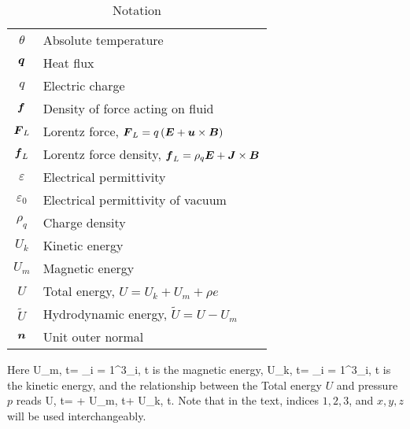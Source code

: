 \begin{table}[H]
\begin{tabular}{ |c|l| }
        $\theta$ & Absolute temperature\\
        $\mbox{\boldmath $q$}$ & Heat flux\\
        $q$ & Electric charge\\
        $\mbox{\boldmath $f$}$ & Density of force acting on fluid\\
        $\mbox{\boldmath $F$}_L$ & Lorentz force, $\mbox{\boldmath $F$}_L = q\left(\mbox{\boldmath $E$} + \mbox{\boldmath $u$}\times\mbox{\boldmath $B$}\right)$\\
        $\mbox{\boldmath $f$}_L$ & Lorentz force density, $\mbox{\boldmath $f$}_L = \rho_q\mbox{\boldmath $E$} + \mbox{\boldmath $J$}\times\mbox{\boldmath $B$}$\\
        $\varepsilon$ & Electrical permittivity\\
        $\varepsilon_0$ & Electrical permittivity of vacuum\\
        $\rho_q$ & Charge density\\
        $U_k$ & Kinetic energy\\ 
        $U_m$ & Magnetic energy\\ 
        $U$ & Total energy, $U = U_k + U_m + \rho e$ \\ 
        $\tilde{U}$ & Hydrodynamic energy, $\tilde{U} = U - U_m$ \\ 
        $\mbox{\boldmath $n$}$ & Unit outer normal\\
        \hline
    \end{tabular}
    \caption{Notation}
	\label{table:notation}
\end{table}
Here
\be
\label{magU}
U_m\lo\bfx, t\ro =  \sum_{i = 1}^{3}\bfB_i\lo\bfx, t\ro
\ee
is the magnetic energy,
\be
\label{kinU}
U_k\lo\bfx, t\ro =  \sum_{i = 1}^{3}\bfu_i\lo\bfx, t\ro
\ee
is the kinetic energy, and the relationship between the Total energy $U$ and pressure $p$ reads
\be
\label{presU}
U\lo\bfx, t\ro =  + U_m\lo\bfx, t\ro + U_k\lo\bfx, t\ro.
\ee
Note that in the text, indices $1, 2, 3$, and $x, y, z$ will be used interchangeably.
